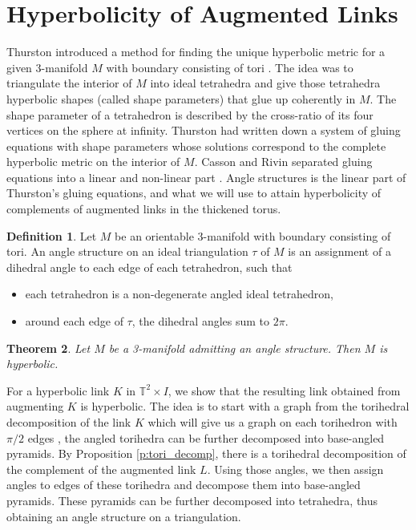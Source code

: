 \documentclass[11pt]{amsart}
\newcommand{\prpref}[1]{Proposition \ref{#1}}
\newcommand{\torus}{{\mathbb{T}^2}}
\theoremstyle{plain}
\newtheorem{theorem}{Theorem}[section]
\theoremstyle{definition}
\newtheorem{define}[theorem]{Definition}
\begin{document}
\section{Hyperbolicity of Augmented Links}
Thurston introduced a method for finding the unique hyperbolic metric for a given 3-manifold $M$ with boundary consisting of tori \cite{Thurston}. The idea was to triangulate the interior of $M$ into ideal tetrahedra and give those tetrahedra hyperbolic shapes (called shape parameters) that glue up coherently in $M$. The shape parameter of a tetrahedron is described by the cross-ratio of its four vertices on the sphere at infinity. Thurston had written down a system of gluing equations with shape parameters whose solutions correspond to the complete hyperbolic metric on the interior of $M$. Casson and Rivin separated gluing equations into a linear and non-linear part \cite{Casson-Rivin}. Angle structures is the linear part of Thurston's gluing equations, and what we will use to attain hyperbolicity of complements of augmented links in the thickened torus. 

\begin{define}
Let $M$ be an orientable 3-manifold with boundary consisting of tori. An angle
structure on an ideal triangulation $\tau$ of $M$ is an assignment of a dihedral
angle to each edge of each tetrahedron, such that
\begin{itemize}
\item each tetrahedron is a non-degenerate angled ideal tetrahedron,
\item around each edge of $\tau$, the dihedral angles sum to $2\pi$.
\end{itemize}
\end{define}

\begin{theorem}\cite{Casson-Rivin}\label{thm:Casson-Rivin}
Let $M$ be a 3-manifold admitting an angle structure. Then $M$ is hyperbolic.
\end{theorem}

For a hyperbolic link $K$ in $\torus \times I$, we show
that the resulting link obtained from augmenting $K$ is
hyperbolic. The idea is to start with a graph from the torihedral decomposition
of the link $K$ which will give us a graph on each torihedron with $\pi/2$ edges
\cite{CKP2},
the angled torihedra can be further decomposed into base-angled pyramids.
By \prpref{p:tori_decomp},
there is a torihedral decomposition of the complement of the augmented link $L$.
Using those angles,
we then assign angles to edges of these torihedra
and decompose them into base-angled pyramids.
These pyramids can be further decomposed into tetrahedra,
thus obtaining an angle structure on a triangulation.
\end{document}
